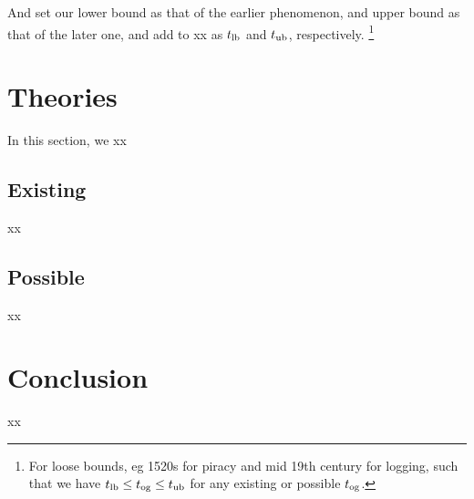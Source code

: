 		And set our lower bound as that of the earlier phenomenon, and upper bound as that of the later one, and add to xx as \(t_{\operatorname{lb}}\) and \(t_{\operatorname{ub}}\), respectively.%
		\footnote{For loose bounds, eg 1520s for piracy and mid 19th century for logging, such that we have \(t_{\operatorname{lb}}\leq t_{\operatorname{og}}\leq t_{\operatorname{ub}}\) for any existing or possible \(t_{\operatorname{og}}\).} %
%
%
%
\section{Theories}
\label{s:theories}
	In this section, we xx
	\subsection{Existing}
	\label{ss:existing}
		xx
	\subsection{Possible}
	\label{ss:possible}
		xx
%
%
%
\section{Conclusion}
\label{s:concl}
	xx
%
%
%
